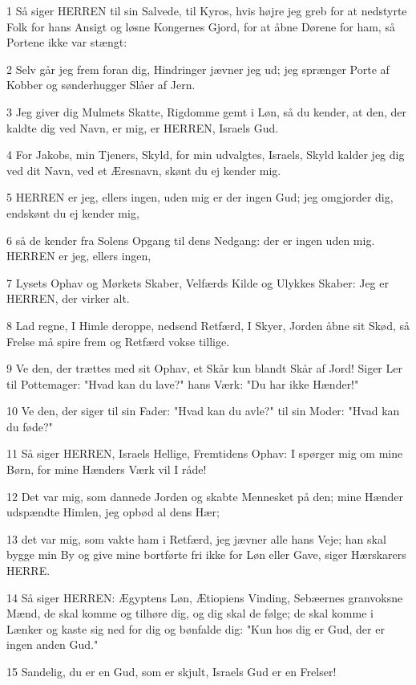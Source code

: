 \par 1 Så siger HERREN til sin Salvede, til Kyros, hvis højre jeg greb for at nedstyrte Folk for hans Ansigt og løsne Kongernes Gjord, for at åbne Dørene for ham, så Portene ikke var stængt:
\par 2 Selv går jeg frem foran dig, Hindringer jævner jeg ud; jeg sprænger Porte af Kobber og sønderhugger Slåer af Jern.
\par 3 Jeg giver dig Mulmets Skatte, Rigdomme gemt i Løn, så du kender, at den, der kaldte dig ved Navn, er mig, er HERREN, Israels Gud.
\par 4 For Jakobs, min Tjeners, Skyld, for min udvalgtes, Israels, Skyld kalder jeg dig ved dit Navn, ved et Æresnavn, skønt du ej kender mig.
\par 5 HERREN er jeg, ellers ingen, uden mig er der ingen Gud; jeg omgjorder dig, endskønt du ej kender mig,
\par 6 så de kender fra Solens Opgang til dens Nedgang: der er ingen uden mig. HERREN er jeg, ellers ingen,
\par 7 Lysets Ophav og Mørkets Skaber, Velfærds Kilde og Ulykkes Skaber: Jeg er HERREN, der virker alt.
\par 8 Lad regne, I Himle deroppe, nedsend Retfærd, I Skyer, Jorden åbne sit Skød, så Frelse må spire frem og Retfærd vokse tillige.
\par 9 Ve den, der trættes med sit Ophav, et Skår kun blandt Skår af Jord! Siger Ler til Pottemager: "Hvad kan du lave?" hans Værk: "Du har ikke Hænder!"
\par 10 Ve den, der siger til sin Fader: "Hvad kan du avle?" til sin Moder: "Hvad kan du føde?"
\par 11 Så siger HERREN, Israels Hellige, Fremtidens Ophav: I spørger mig om mine Børn, for mine Hænders Værk vil I råde!
\par 12 Det var mig, som dannede Jorden og skabte Mennesket på den; mine Hænder udspændte Himlen, jeg opbød al dens Hær;
\par 13 det var mig, som vakte ham i Retfærd, jeg jævner alle hans Veje; han skal bygge min By og give mine bortførte fri ikke for Løn eller Gave, siger Hærskarers HERRE.
\par 14 Så siger HERREN: Ægyptens Løn, Ætiopiens Vinding, Sebæernes granvoksne Mænd, de skal komme og tilhøre dig, og dig skal de følge; de skal komme i Lænker og kaste sig ned for dig og bønfalde dig: "Kun hos dig er Gud, der er ingen anden Gud."
\par 15 Sandelig, du er en Gud, som er skjult, Israels Gud er en Frelser!
